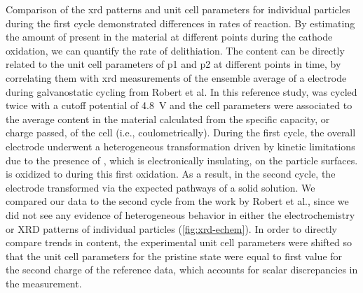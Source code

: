 \documentclass{article}
\begin{document}
Comparison of the \gls{xrd} patterns and unit cell parameters for
individual particles during the first cycle demonstrated differences
in rates of reaction. By estimating the amount of  present in
the material at different points during the cathode oxidation, we can
quantify the rate of delithiation. The  content can be directly
related to the unit cell parameters of \gls{p1} and \gls{p2} at
different points in time, by correlating them with \gls{xrd}
measurements of the ensemble average of a \nca{} electrode during
galvanostatic cycling from Robert et al\cite{Robert2015}. In this
reference study, \nca{} was cycled twice with a cutoff potential of
\SI{4.8}{\volt} and the cell parameters were associated to the average
 content in the material calculated from the specific capacity,
or charge passed, of the cell (i.e., coulometrically). During the
first cycle, the overall \nca{} electrode underwent a heterogeneous
transformation driven by kinetic limitations due to the presence of
, which is electronically insulating, on the particle
surfaces.  is oxidized to  during this first
oxidation. As a result, in the second cycle, the electrode transformed
via the expected pathways of a solid solution. We compared our data to
the second cycle from the work by Robert et al., since we did not see
any evidence of heterogeneous behavior in either the electrochemistry
or XRD patterns of individual particles (\ref{fig:xrd-echem}). In
order to directly compare trends in  content, the experimental
unit cell parameters were shifted so that the unit cell parameters for
the pristine state were equal to first value for the second charge of
the reference data, which accounts for scalar discrepancies in the
measurement.

\end{document}

